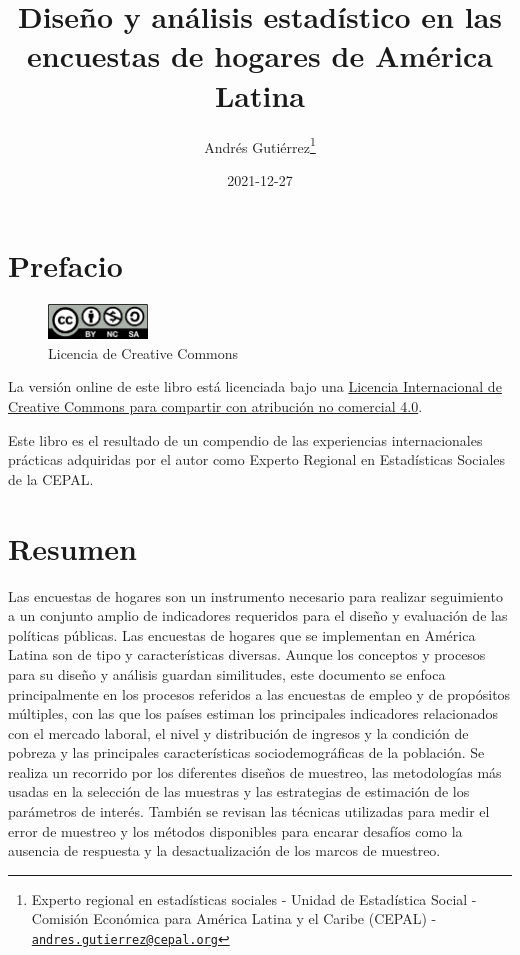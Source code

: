 \documentclass[
  12pt,
  spanish,
]{book}
\title{Diseño y análisis estadístico en las encuestas de hogares de América Latina}
\author{Andrés Gutiérrez\footnote{Experto regional en estadísticas sociales - Unidad de Estadística Social - Comisión Económica para América Latina y el Caribe (CEPAL) - \href{mailto:andres.gutierrez@cepal.org}{\nolinkurl{andres.gutierrez@cepal.org}}}}
\date{2021-12-27}
\begin{document}
\maketitle

{
\hypersetup{linkcolor=}
\setcounter{tocdepth}{1}
\tableofcontents
}
\listoftables
\listoffigures
\hypertarget{prefacio}{%
\chapter*{Prefacio}\label{prefacio}}

\begin{figure}
\includegraphics[width=100px]{Pics/CClicence} \caption{Licencia de Creative Commons}\label{fig:unnamed-chunk-1}
\end{figure}

La versión online de este libro está licenciada bajo una \href{http://creativecommons.org/licenses/by-nc-sa/4.0/}{Licencia Internacional de Creative Commons para compartir con atribución no comercial 4.0}.

Este libro es el resultado de un compendio de las experiencias internacionales prácticas adquiridas por el autor como Experto Regional en Estadísticas Sociales de la CEPAL.

\hypertarget{resumen}{%
\chapter*{Resumen}\label{resumen}}

Las encuestas de hogares son un instrumento necesario para realizar seguimiento a un conjunto amplio de indicadores requeridos para el diseño y evaluación de las políticas públicas. Las encuestas de hogares que se implementan en América Latina son de tipo y características diversas. Aunque los conceptos y procesos para su diseño y análisis guardan similitudes, este documento se enfoca principalmente en los procesos referidos a las encuestas de empleo y de propósitos múltiples, con las que los países estiman los principales indicadores relacionados con el mercado laboral, el nivel y distribución de ingresos y la condición de pobreza y las principales características sociodemográficas de la población. Se realiza un recorrido por los diferentes diseños de muestreo, las metodologías más usadas en la selección de las muestras y las estrategias de estimación de los parámetros de interés. También se revisan las técnicas utilizadas para medir el error de muestreo y los métodos disponibles para encarar desafíos como la ausencia de respuesta y la desactualización de los marcos de muestreo.
\end{document}

